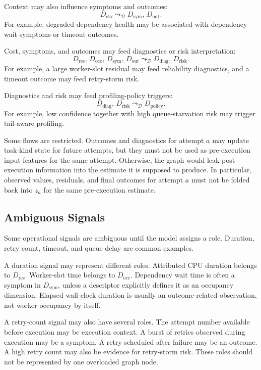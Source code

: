 Context may also influence symptoms and outcomes:
\[
D_{\mathrm{ctx}}
\leadsto_{\mathcal{D}}
D_{\mathrm{sym}},\,D_{\mathrm{out}}.
\]
For example, degraded dependency health may be associated with dependency-wait
symptoms or timeout outcomes.

Cost, symptoms, and outcomes may feed diagnostics or risk interpretation:
\[
D_{\mathrm{res}},\,D_{\mathrm{occ}},\,D_{\mathrm{sym}},\,D_{\mathrm{out}}
\leadsto_{\mathcal{D}}
D_{\mathrm{diag}},\,D_{\mathrm{risk}}.
\]
For example, a large worker-slot residual may feed reliability diagnostics, and
a timeout outcome may feed retry-storm risk.

Diagnostics and risk may feed profiling-policy triggers:
\[
D_{\mathrm{diag}},\,D_{\mathrm{risk}}
\leadsto_{\mathcal{D}}
D_{\mathrm{policy}}.
\]
For example, low confidence together with high queue-starvation risk may trigger
tail-aware profiling.

Some flows are restricted. Outcomes and diagnostics for attempt $a$ may update
task-kind state for future attempts, but they must not be used as pre-execution
input features for the same attempt. Otherwise, the graph would leak
post-execution information into the estimate it is supposed to produce. In
particular, observed values, residuals, and final outcomes for attempt $a$ must
not be folded back into $z_a$ for the same pre-execution estimate.

\subsection{Ambiguous Signals}
\label{sec:influence-domain-ambiguous-signals}

Some operational signals are ambiguous until the model assigns a role. Duration,
retry count, timeout, and queue delay are common examples.

A duration signal may represent different roles. Attributed CPU duration belongs
to $D_{\mathrm{res}}$. Worker-slot time belongs to $D_{\mathrm{occ}}$.
Dependency wait time is often a symptom in $D_{\mathrm{sym}}$, unless a
descriptor explicitly defines it as an occupancy dimension. Elapsed wall-clock
duration is usually an outcome-related observation, not worker occupancy by
itself.

A retry-count signal may also have several roles. The attempt number available
before execution may be execution context. A burst of retries observed during
execution may be a symptom. A retry scheduled after failure may be an outcome. A
high retry count may also be evidence for retry-storm risk. These roles should
not be represented by one overloaded graph node.

